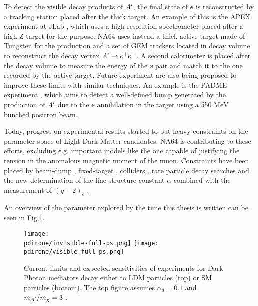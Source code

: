 To detect the visible decay products of $A'$, the final state of $\ee$ is reconstructed by a tracking station placed after the thick target. An example of this is the APEX experiment at JLab \cite{apex}, which uses a high-resolution spectrometer placed after a high-Z target for the purpose. NA64 uses instead a thick active target made of Tungsten for the production and a set of GEM trackers located in decay volume to reconstruct the decay vertex $A' \to e^+e^-$. A second calorimeter is placed after the decay volume to measure the energy of the $\ee$ pair and match it to the one recorded by the active target. Future experiment are also being proposed to improve these limits with similar techniques. An example is the PADME experiment \cite{Chiodini:2020gdj}, which aims to detect a well-defined bump generated by the production of $A'$ due to the $\ee$ annihilation in the target using a 550 $\si{\mega\electronvolt}$ bunched positron beam.

Today, progress on experimental results started to put heavy constraints on the parameter space of Light Dark Matter candidates. NA64 is contributing to these efforts, excluding e.g. important models like the one capable of justifying the tension in the anomalous magnetic moment of the muon. Constraints have been placed by beam-dump \cite{jdb, charm, PhysRevLett.59.755, e137, konaka, PhysRevLett.67.2942, dav,  ath, nomad, e787, essig1, blum,sg1, blum1, sarah1}, fixed-target \cite{apex,merkel,merkel1}, colliders \cite{babar, curt, babar1}, rare particle decay searches \cite{sindrum, kloe, sg2, kloe2, wasa, hades, phenix, e949, na48, pol, kloe3} and the new determination of the fine structure constant $\alpha$ combined with the measurement of $(g-2)_e$ \cite{Parker191,PhysRevLett.100.120801}.

An overview of the parameter explored by the time this thesis is written can be seen in Fig.\ref{fig:dmplane-overview}.

\begin{figure}[bth!]
  \centering
  \texttt{[image: \\pdirone/invisible-full-ps.png]}
  \texttt{[image: \\pdirone/visible-full-ps.png]}
  \caption[Current exclusion limit and project for Dark Photon in the physics community]{Current limits and expected sensitivities of experiments for Dark Photon mediators decay either to LDM particles (top) or SM particles (bottom). The top figure assumes $\alpha_d = 0.1$ and $m_{A'}/m_{\chi} = 3$ \cite{pbc-book}.}
  \label{fig:dmplane-overview}
\end{figure}  

